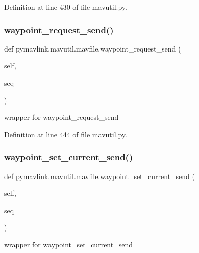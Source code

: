 Definition at line 430 of file mavutil.\+py.

\mbox{\label{classpymavlink_1_1mavutil_1_1mavfile_af14da05495c0927374c4356a527ad406}} 
\subsubsection{\texorpdfstring{waypoint\_request\_send()}{waypoint\_request\_send()}}
{\footnotesize\ttfamily def pymavlink.\+mavutil.\+mavfile.\+waypoint\+\_\+request\+\_\+send (\begin{DoxyParamCaption}\item[{}]{self,  }\item[{}]{seq }\end{DoxyParamCaption})}

\begin{DoxyVerb}wrapper for waypoint_request_send\end{DoxyVerb}
 

Definition at line 444 of file mavutil.\+py.

\mbox{\label{classpymavlink_1_1mavutil_1_1mavfile_a5ada29335e23c51ef5902135668d07db}} 
\subsubsection{\texorpdfstring{waypoint\_set\_current\_send()}{waypoint\_set\_current\_send()}}
{\footnotesize\ttfamily def pymavlink.\+mavutil.\+mavfile.\+waypoint\+\_\+set\+\_\+current\+\_\+send (\begin{DoxyParamCaption}\item[{}]{self,  }\item[{}]{seq }\end{DoxyParamCaption})}

\begin{DoxyVerb}wrapper for waypoint_set_current_send\end{DoxyVerb}
 

